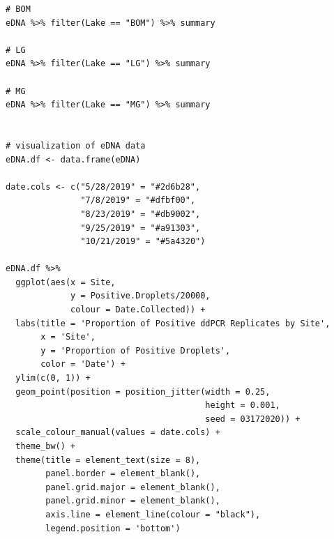 \documentclass[12pt]{article}\usepackage[]{graphicx}\usepackage[]{color}
\makeatletter
\newenvironment{kframe}{%
 \def\at@end@of@kframe{}%
 \ifinner\ifhmode%
  \def\at@end@of@kframe{\end{minipage}}%
  \begin{minipage}{\columnwidth}%
 \fi\fi%
 \def\FrameCommand##1{\hskip\@totalleftmargin \hskip-\fboxsep
 \colorbox{shadecolor}{##1}\hskip-\fboxsep
     \hskip-\linewidth \hskip-\@totalleftmargin \hskip\columnwidth}%
 \MakeFramed {\advance\hsize-\width
   \@totalleftmargin\z@ \linewidth\hsize
   \@setminipage}}%
 {\par\unskip\endMakeFramed%
 \at@end@of@kframe}
\newenvironment{knitrout}{}{} %
\newenvironment{kframe}{%
 \def\at@end@of@kframe{}%
 \ifinner\ifhmode%
  \def\at@end@of@kframe{\end{minipage}}%
  \begin{minipage}{\columnwidth}%
 \fi\fi%
 \def\FrameCommand##1{\hskip\@totalleftmargin \hskip-\fboxsep
 \colorbox{shadecolor}{##1}\hskip-\fboxsep
     \hskip-\linewidth \hskip-\@totalleftmargin \hskip\columnwidth}%
 \MakeFramed {\advance\hsize-\width
   \@totalleftmargin\z@ \linewidth\hsize
   \@setminipage}}%
 {\par\unskip\endMakeFramed%
 \at@end@of@kframe}
\newenvironment{knitrout}{}{} %
\makeatother
\begin{document}
\begin{knitrout}
\begin{kframe}
\begin{verbatim}
# BOM
eDNA %>% filter(Lake == "BOM") %>% summary

# LG
eDNA %>% filter(Lake == "LG") %>% summary

# MG
eDNA %>% filter(Lake == "MG") %>% summary


# visualization of eDNA data
eDNA.df <- data.frame(eDNA)

date.cols <- c("5/28/2019" = "#2d6b28", 
               "7/8/2019" = "#dfbf00",
               "8/23/2019" = "#db9002",
               "9/25/2019" = "#a91303",
               "10/21/2019" = "#5a4320")

eDNA.df %>% 
  ggplot(aes(x = Site, 
             y = Positive.Droplets/20000, 
             colour = Date.Collected)) + 
  labs(title = 'Proportion of Positive ddPCR Replicates by Site', 
       x = 'Site', 
       y = 'Proportion of Positive Droplets', 
       color = 'Date') +
  ylim(c(0, 1)) + 
  geom_point(position = position_jitter(width = 0.25, 
                                        height = 0.001, 
                                        seed = 03172020)) + 
  scale_colour_manual(values = date.cols) + 
  theme_bw() + 
  theme(title = element_text(size = 8),
        panel.border = element_blank(), 
        panel.grid.major = element_blank(),
        panel.grid.minor = element_blank(), 
        axis.line = element_line(colour = "black"), 
        legend.position = 'bottom')
\end{verbatim}
\end{kframe}
\end{knitrout}


\end{document}
